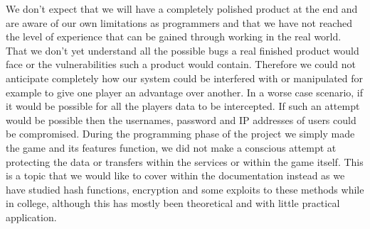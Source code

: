 We don't expect that we will have a completely polished product at the end and are aware of our own limitations as programmers and that we have not reached the level of experience that can be gained through working in the real world. That we don't yet understand all the possible bugs a real finished product would face or the vulnerabilities such a product would contain. Therefore we could not anticipate completely how our system could be interfered with or manipulated for example to give one player an advantage over another. In a worse case scenario, if it would be possible for all the players data to be intercepted. If such an attempt would be possible then the usernames, password and IP addresses of users could be compromised. During the programming phase of the project we simply made the game and its features function, we did not make a conscious attempt at protecting the data or transfers within the services or within the game itself. This is a topic that we would like to cover within the documentation instead as we have studied hash functions, encryption and some exploits to these methods while in college, although this has mostly been theoretical and with little practical application.




